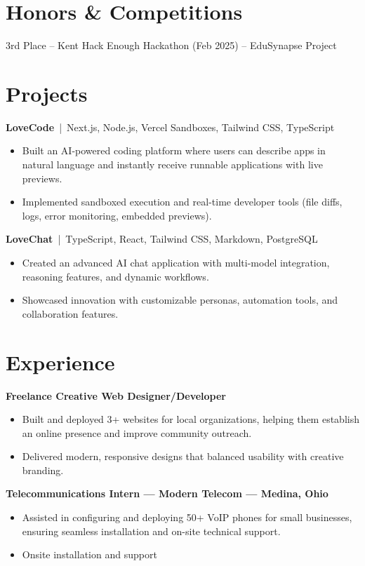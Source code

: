 \documentclass[10pt]{article}
\begin{document}
\section*{Honors \& Competitions}
3rd Place – Kent Hack Enough Hackathon (Feb 2025) – EduSynapse Project

\section*{Projects}

\textbf{LoveCode} \,|\, Next.js, Node.js, Vercel Sandboxes, Tailwind CSS, TypeScript
\begin{itemize}
  \item Built an AI-powered coding platform where users can describe apps in natural language and instantly receive runnable applications with live previews.
  \item Implemented sandboxed execution and real-time developer tools (file diffs, logs, error monitoring, embedded previews).
\end{itemize}

\textbf{LoveChat} \,|\, TypeScript, React, Tailwind CSS, Markdown, PostgreSQL
\begin{itemize}
  \item Created an advanced AI chat application with multi-model integration, reasoning features, and dynamic workflows.
  \item Showcased innovation with customizable personas, automation tools, and collaboration features.
\end{itemize}

\section*{Experience}
\textbf{Freelance Creative Web Designer/Developer}
\begin{itemize}
  \item Built and deployed 3+ websites for local organizations, helping them establish an online presence and improve community outreach.
  \item Delivered modern, responsive designs that balanced usability with creative branding.
\end{itemize}

\textbf{Telecommunications Intern — Modern Telecom — Medina, Ohio}
\begin{itemize}
  \item Assisted in configuring and deploying 50+ VoIP phones for small businesses, ensuring seamless installation and on-site technical support.
  \item Onsite installation and support
\end{itemize}
\end{document}
